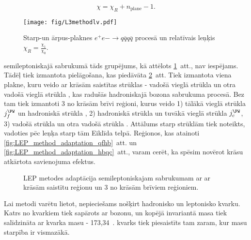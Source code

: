 \begin{equation}
  \chi=\chi_{R} + n_{\text{plane}} - 1.
\end{equation}

\begin{figure}[hbtp]
  \centering
  \texttt{[image: fig/L3methodlv.pdf]}
  \caption{Starp-\PW un ārpus-\PW plaknes $e^{+}e{-}\rightarrow q\overline{q}q\overline{q}$ procesā un relatīvais leņķis $\chi_{R}=\frac{\chi_{1}}{\chi_{0}}$.}
  \label{fig:LEP_method}
\end{figure}

 \ttbar semileptoniskajā sabrukumā tāds grupējums, kā attēlots \ref{fig:LEP_method}~att., nav iespējams. Tādēļ tiek izmantota pielāgošana, kas piedāvāta \ref{fig:LEP_method_adaptation}~att. Tiek izmantota viena plakne, kuru veido ar krāsām saistītas strūklas - vadošā vieglā strūkla \leadingjet un otra vadošā vieglā strūkla \scndleadingjet, kas radušās hadroniskajā \PW bozona sabrukuma procesā. Bez tam tiek izmantoti 3 no krāsām brīvi reģioni, kurus veido 1) tālākā vieglā strūkla $j^{\PW}_{f}$ un hadroniskā \cPqb strūkla \hadronicb, 2) hadroniskā \cPqb strūkla \hadronicb un tuvākā vieglā strūkla $j^{\PW}_{c}$, 3) vadošā \cPqb strūkla \leadingb un otra vadošā \cPqb strūkla \scndleadingb. Attālums starp strūklām tiek noteikts, vadoties pēc leņķa starp tām Eiklīda telpā. Reģionos, kas atainoti \ref{fig:LEP_method_adaptation_qfhb}~att. un \ref{fig:LEP_method_adaptation_hbqc}~att., varam cerēt, ka spēsim novērot krāsu atkārtota savienojuma efektus.

\begin{figure}[hbtp]
  \centering
  \def\twidth{0.24}
  \hfil
 \hfil
  \hfil
  \caption{LEP metodes adaptācija \ttbar semileptoniskajam sabrukumam ar ar krāsām saistītu reģionu un 3 no krāsām brīviem reģioniem.}
  \label{fig:LEP_method_adaptation}
\end{figure}

Lai metodi varētu lietot, nepieciešams nošķirt hadronisko un leptonisko \cPqb kvarku. Katrs no \cPqb kvarkiem tiek sapārots ar \PW bozonu, un kopējā invariantā masa tiek salīdzināta ar \cPqt kvarka masu - 173,34~\GeV. \cPqb kvarks tiek piesaistīts tam zaram, kur masu starpība ir vismazākā. 

